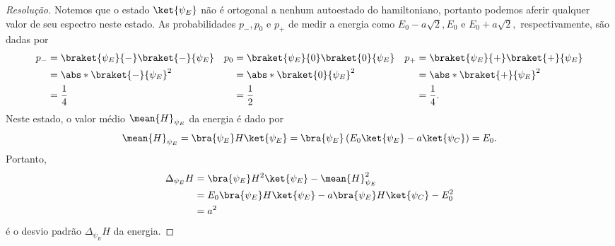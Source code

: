 \begin{proof}[Resolução]
    Notemos que o estado \(\ket{\psi_E}\) não é ortogonal a nenhum autoestado do hamiltoniano, portanto podemos aferir qualquer valor de seu espectro neste estado. As probabilidades \(p_-, p_0\) e \(p_+\) de medir a energia como \(E_0 - a\sqrt{2}, E_0\) e \(E_0 + a\sqrt{2},\) respectivamente, são dadas por
    \begin{align*}
        p_{-} &= \braket{\psi_E}{-}\braket{-}{\psi_E}&
        p_{0} &= \braket{\psi_E}{0}\braket{0}{\psi_E}&
        p_{+} &= \braket{\psi_E}{+}\braket{+}{\psi_E}\\
              &= \abs*{\braket{-}{\psi_E}}^2&
              &= \abs*{\braket{0}{\psi_E}}^2&
              &= \abs*{\braket{+}{\psi_E}}^2\\
              &= \frac14&
              &= \frac12&
              &= \frac14.
    \end{align*}
    Neste estado, o valor médio \(\mean{H}_{\psi_E}\) da energia é dado por
    \begin{equation*}
        \mean{H}_{\psi_E} = \bra{\psi_E}H\ket{\psi_E}
                          = \bra{\psi_E}\left(E_0\ket{\psi_E} - a\ket{\psi_C}\right) = E_0.
    \end{equation*}
    Portanto,
    \begin{align*}
        \Delta_{\psi_E}H &= \bra{\psi_E}H^2\ket{\psi_E} - \mean{H}_{\psi_E}^2\\
                         &= E_0\bra{\psi_E}H\ket{\psi_E} - a \bra{\psi_E} H \ket{\psi_C} - E_0^2\\
                         &= a^2
    \end{align*}
    é o desvio padrão \(\Delta_{\psi_E}H\) da energia.
\end{proof}


